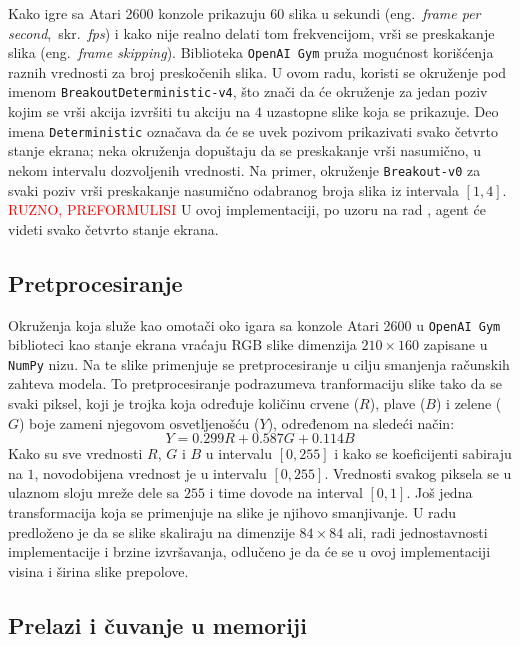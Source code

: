 \par 
Kako igre sa Atari 2600 konzole prikazuju $60$ slika u sekundi (eng.~{\em frame per second},~skr.~{\em fps}) i kako nije realno delati tom frekvencijom, vrši se preskakanje slika (eng.~{\em frame skipping}). Biblioteka \texttt{OpenAI Gym} pruža mogućnost korišćenja raznih vrednosti za broj preskočenih slika. U ovom radu, koristi se okruženje pod imenom \texttt{BreakoutDeterministic-v4}, što znači da će okruženje za jedan poziv kojim se vrši akcija izvršiti tu akciju na $4$ uzastopne slike koja se prikazuje. Deo imena \texttt{Deterministic} označava da će se uvek pozivom prikazivati svako četvrto stanje ekrana; neka okruženja dopuštaju da se preskakanje vrši nasumično, u nekom intervalu dozvoljenih vrednosti. Na primer, okruženje \texttt{Breakout-v0} za svaki poziv vrši preskakanje nasumično odabranog broja slika iz intervala $[1,4]$. \textcolor{red}{RUZNO, PREFORMULISI} U ovoj implementaciji, po uzoru na rad \cite{dqn_dm}, agent će videti svako četvrto stanje ekrana. 

\subsection{Pretprocesiranje}
\label{ss:pretprocesiranje}
Okruženja koja služe kao omotači oko igara sa konzole Atari 2600 u \texttt{OpenAI Gym} biblioteci kao stanje ekrana vraćaju RGB slike dimenzija $210 \times 160$ zapisane u \texttt{NumPy} nizu. Na te slike primenjuje se pretprocesiranje u cilju smanjenja računskih zahteva modela. To pretprocesiranje podrazumeva tranformaciju slike tako da se svaki piksel, koji je trojka koja određuje količinu crvene ($R$), plave ($B$) i zelene ($G$) boje zameni njegovom osvetljenošću ($Y$), određenom na sledeći način:
\begin{equation}
\label{eq:lum}
	Y = 0.299 R + 0.587 G + 0.114 B
\end{equation}
Kako su sve vrednosti $R$, $G$ i $B$ u intervalu $[0, 255]$ i kako se koeficijenti sabiraju na $1$, novodobijena vrednost je u intervalu $[0, 255]$. Vrednosti svakog piksela se u ulaznom sloju mreže dele sa $255$ i time dovode na interval $[0, 1]$. Još jedna transformacija koja se primenjuje na slike je njihovo smanjivanje. U radu \cite{dqn_dm} predloženo je da se slike skaliraju na dimenzije $84 \times 84$ ali, radi jednostavnosti implementacije i brzine izvršavanja, odlučeno je da će se u ovoj implementaciji visina i širina slike prepolove.

\subsection{Prelazi i čuvanje u memoriji}

